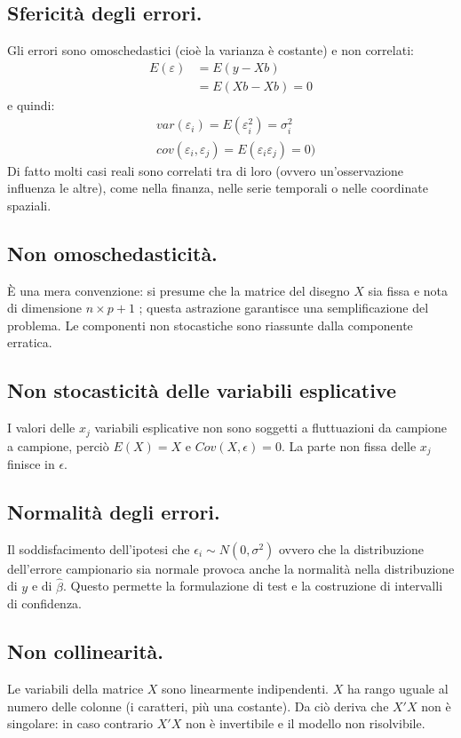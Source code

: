 \documentclass[11pt, twocolumn]{article}
\begin{document}
\subsection*{Sfericità degli errori.}
Gli errori sono omoschedastici (cioè la varianza è costante) e non correlati:
\begin{align*}
  E(\varepsilon) &= E(y - Xb) \\
                 &= E(Xb - Xb) = 0
\end{align*}
e quindi:
\begin{align*}
  &var(\varepsilon_i) = E(\varepsilon_i^2) = \sigma_i^2 \\
  &cov(\varepsilon_i, \varepsilon_j) = E(\varepsilon_i\varepsilon_j) = 0)
\end{align*}
Di fatto molti casi reali sono correlati tra di loro (ovvero un'osservazione influenza le altre), come nella finanza, nelle serie temporali o nelle coordinate spaziali.

\subsection*{Non omoschedasticità.}
È una mera convenzione: si presume che la matrice del disegno $X$ sia fissa e nota di dimensione $n \times p+1$ ; questa astrazione garantisce una semplificazione del problema.
Le componenti non stocastiche sono riassunte dalla componente erratica.

\subsection*{Non stocasticità delle variabili esplicative}
I valori delle $x_j$ variabili esplicative non sono soggetti a fluttuazioni da campione a campione, perciò $E(X) = X$ e $Cov(X,\epsilon) = 0$. La parte non fissa delle $x_j$ finisce in $\epsilon$.

\subsection*{Normalità degli errori.}
Il soddisfacimento dell'ipotesi che $\epsilon_i \sim N(0,\sigma^2)$ ovvero che la distribuzione dell’errore campionario sia normale provoca anche la normalità nella distribuzione di $y$ e di $\hat{\beta}$.
Questo permette la formulazione di test e la costruzione di intervalli di confidenza.


\subsection*{Non collinearità.}
Le variabili della matrice $X$ sono linearmente indipendenti. $X$ ha rango uguale al numero delle colonne (i caratteri, più una costante). Da ciò deriva che $X'X$ non è singolare: in caso contrario $X'X$ non è invertibile e il modello non risolvibile.
\end{document}
